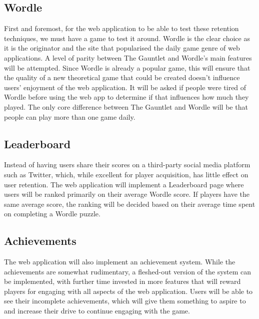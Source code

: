 \subsection{Wordle}
First and foremost, for the web application to be able to test these retention techniques, we must have a game to test it around. Wordle is the clear choice as it is the originator and the site that popularised the daily game genre of web applications. A level of parity between The Gauntlet and Wordle's main features will be attempted. Since Wordle is already a popular game, this will ensure that the quality of a new theoretical game that could be created doesn't influence users' enjoyment of the web application. It will be asked if people were tired of Wordle before using the web app to determine if that influences how much they played. The only core difference between The Gauntlet and Wordle will be that people can play more than one game daily.

\subsection{Leaderboard}
Instead of having users share their scores on a third-party social media platform such as Twitter, which, while excellent for player acquisition, has little effect on user retention. The web application will implement a Leaderboard page where users will be ranked primarily on their average Wordle score. If players have the same average score, the ranking will be decided based on their average time spent on completing a Wordle puzzle. 

\subsection{Achievements}
The web application will also implement an achievement system. While the achievements are somewhat rudimentary, a fleshed-out version of the system can be implemented, with further time invested in more features that will reward players for engaging with all aspects of the web application. Users will be able to see their incomplete achievements, which will give them something to aspire to and increase their drive to continue engaging with the game.

